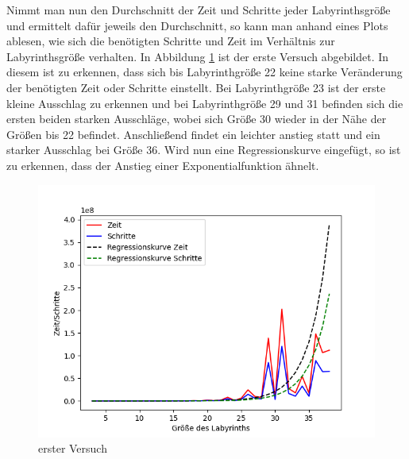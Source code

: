 \documentclass[11pt, a4paper]{article}
\begin{document}
Nimmt man nun den Durchschnitt der Zeit und Schritte jeder Labyrinthsgröße und ermittelt dafür jeweils den Durchschnitt, so kann man anhand eines Plots ablesen, wie sich die benötigten Schritte und Zeit im Verhältnis zur Labyrinthsgröße verhalten.  
In Abbildung \ref{fig:Plot v1} ist der erste Versuch abgebildet. In diesem ist zu erkennen, dass sich bis Labyrinthgröße 22 keine starke Veränderung der benötigten Zeit oder Schritte einstellt. Bei Labyrinthgröße 23 ist der erste kleine Ausschlag zu erkennen und bei Labyrinthgröße 29 und 31 befinden sich die ersten beiden starken Ausschläge, wobei sich Größe 30 wieder in der Nähe der Größen bis 22 befindet. Anschließend findet ein leichter anstieg statt und ein starker Ausschlag bei Größe 36. 
Wird nun eine Regressionskurve eingefügt, so ist zu erkennen, dass der Anstieg einer Exponentialfunktion ähnelt.

\begin{figure}[h]
\centering
\includegraphics[scale=.5]{v1Aus.png}
\caption{erster Versuch}
\label{fig:Plot v1}
\end{figure}
\end{document}
